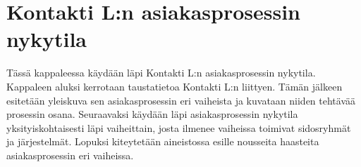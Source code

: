 \documentclass[finnish,12pt,a4paper,pdftex]{article}
\begin{document}



\section{Kontakti L:n asiakasprosessin nykytila}

Tässä kappaleessa käydään läpi Kontakti L:n asiakasprosessin nykytila. Kappaleen aluksi kerrotaan taustatietoa Kontakti L:n liittyen. Tämän jälkeen esitetään yleiskuva sen asiakasprosessin eri vaiheista ja kuvataan niiden tehtävää prosessin osana. Seuraavaksi käydään läpi asiakasprosessin nykytila yksityiskohtaisesti läpi vaiheittain, josta ilmenee vaiheissa toimivat sidosryhmät ja järjestelmät. Lopuksi kiteytetään aineistossa esille nousseita haasteita asiakasprosessin eri vaiheissa.
\end{document}
